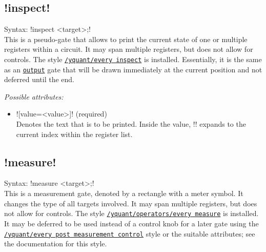 \documentclass{scrartcl}
\def\gate#1{\hyperref[gate:#1]{\texttt{#1}}}
\def\style#1{\hyperref[style:#1]{\texttt{#1}}}
\begin{document}
      \subsection[\texorpdfstring{\yquant!inspect!}{inspect}]{\yquant!inspect!}\label{gate:inspect}
         Syntax: \yquant!inspect <target>;! \\
         This is a pseudo\hyp gate that allows to print the current state of one or multiple registers within a circuit.
         It may span multiple registers, but does not allow for controls.
         The style \style{/yquant/every inspect} is installed.
         Essentially, it is the same as an \gate{output} gate that will be drawn immediately at the current position and not deferred until the end.

         \emph{Possible attributes:}
         \begin{itemize}
            \item \yquant![value=<value>]! (required) \\
               Denotes the text that is to be printed.
               Inside the value, \tex!\idx! expands to the current index within the register list.
         \end{itemize}

      \subsection[\texorpdfstring{\yquant!measure!}{measure}]{\yquant!measure!}\label{gate:measure}
         Syntax: \yquant!measure <target>;! \\
         This is a measurement gate, denoted by a rectangle with a meter symbol.
         It changes the type of all targets involved.
         It may span multiple registers, but does not allow for controls.
         The style \style{/yquant/operators/every measure} is installed.
         It may be deferred to be used instead of a control knob for a later gate using the \style{/yquant/every post measurement control} style or the suitable attributes; see the documentation for this style.
\end{document}
